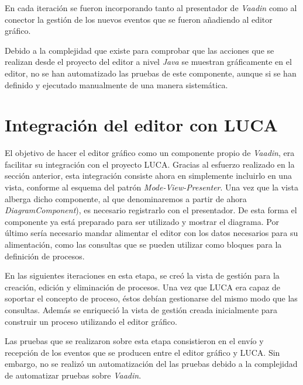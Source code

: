 En cada iteración se fueron incorporando tanto al presentador de \emph{Vaadin} como al conector la gestión de los nuevos eventos que se fueron añadiendo al editor gráfico.

Debido a la complejidad que existe para comprobar que las acciones que se realizan desde el proyecto del editor a nivel \emph{Java} se muestran gráficamente en el editor, no se han automatizado las pruebas de este componente, aunque si se han definido y ejecutado manualmente de una manera sistemática. 

\section{Integración del editor con LUCA}

El objetivo de hacer el editor gráfico como un componente propio de \emph{Vaadin}, era facilitar su integración con el proyecto LUCA. Gracias al esfuerzo realizado en la sección anterior, esta integración consiste ahora en simplemente incluirlo en una vista, conforme al esquema del patrón \emph{Mode-View-Presenter}. Una vez que la vista alberga dicho componente, al que denominaremos a partir de ahora  \emph{DiagramComponent}), es necesario registrarlo con el presentador. De esta forma el componente ya está preparado para ser utilizado y mostrar el diagrama. Por último sería necesario mandar alimentar el editor con los datos necesarios para su alimentación, como las consultas que se pueden utilizar como bloques para la definición de procesos.


En las siguientes iteraciones en esta etapa, se creó la vista de gestión para la creación, edición y eliminación de procesos. Una vez que LUCA era capaz de soportar el concepto de proceso, éstos debían gestionarse del mismo modo que las consultas. Además se enriqueció la vista de gestión creada inicialmente para construir un proceso utilizando el editor gráfico.

Las pruebas que se realizaron sobre esta etapa consistieron en el envío y recepción de los eventos que se producen entre el editor gráfico y LUCA. Sin embargo, no se realizó un automatización del las pruebas debido a la complejidad de automatizar pruebas sobre \emph{Vaadin}.

